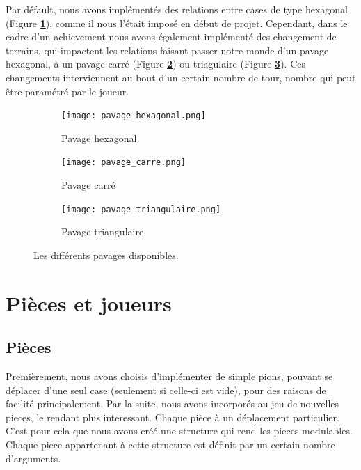         Par défault, nous avons implémentés des relations entre cases de type hexagonal (Figure \textbf{\ref{fig:pavage_hexagonal}}), comme il nous l'était imposé en début de projet. Cependant, dans le cadre d'un achievement nous avons également implémenté des changement de terrains, qui impactent les relations faisant passer notre monde d'un pavage hexagonal, à un pavage carré (Figure \textbf{\ref{fig:pavage_carre}}) ou triagulaire (Figure \textbf{\ref{fig:pavage_triangulaire}}). Ces changements interviennent au bout d'un certain nombre de tour, nombre qui peut être paramétré par le joueur.
        
        \begin{figure}[H]
            \centering
            \begin{subfigure}{0.3\textwidth}
                \centering
                \texttt{[image: pavage\_hexagonal.png]}
                \caption{Pavage hexagonal}
                \label{fig:pavage_hexagonal}
            \end{subfigure}
            \quad
            \begin{subfigure}{0.3\textwidth}
                \centering
                \texttt{[image: pavage\_carre.png]}
                \caption{Pavage carré}
                \label{fig:pavage_carre}
            \end{subfigure}
            \quad 
            \begin{subfigure}{0.3\textwidth}
                \centering
                \texttt{[image: pavage\_triangulaire.png]}
                \caption{Pavage triangulaire}
                \label{fig:pavage_triangulaire}
            \end{subfigure}
            \caption{Les différents pavages disponibles.}
            \label{label_de_la_figure 1}
        \end{figure}
        
        
\section{Pièces et joueurs}
    \subsection{Pièces}\label{part:pawns}
        Premièrement, nous avons choisis d'implémenter de simple pions, pouvant se déplacer d'une seul case (seulement si celle-ci est vide), pour des raisons de facilité principalement. Par la suite, nous avons incorporés au jeu de nouvelles pieces, le rendant plus interessant. Chaque pièce à un déplacement particulier. \\ 
        C'est pour cela que nous avons créé une structure qui rend les pieces modulables. Chaque piece appartenant à cette structure est définit par un certain nombre d'arguments.

